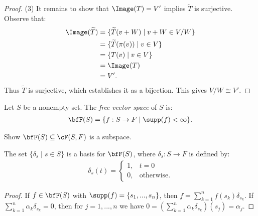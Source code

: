 \begin{proof}
            (3) It remains to show that $\Image(T) = V'$ implies $\widetilde{T}$ is surjective. Observe that:
                \begin{equation*}
                \begin{split}
                    \Image(\widetilde{T})
                    & = \{\widetilde{T}(v+W) \mid v+W \in V/W \} \\
                    & = \{\widetilde{T}(\pi(v)) \mid v \in V \} \\
                    & = \{T(v) \mid v \in V\} \\
                    & = \Image(T) \\
                    & = V'.
                \end{split}
                \end{equation*}
            Thus $\widetilde{T}$ is surjective, which establishes it as a bijection. This gives $V/W \cong V'$.
        \end{proof}

    \begin{definition}
        Let $S$ be a nonempty set. The \textit{free vector space} of $S$ is:
            \begin{equation*}
            \begin{split}
                \bfF(S) = \{f:S \rightarrow F \mid \supp(f) <\infty \}.
            \end{split}
            \end{equation*}
    \end{definition}

    \begin{exercise}
        Show $\bfF(S) \subseteq \cF(S,F)$ is a subspace.
    \end{exercise}

    \begin{proposition}
        The set $\{\delta_s \mid s \in S\}$ is a basis for $\bfF(S)$, where $\delta_s :S \rightarrow F$ is defined by:
            \begin{equation*}
            \begin{split}
                \delta_s(t) = \begin{cases}1, & t =0 \\ 0, & \text{otherwise.} \end{cases}
            \end{split}
            \end{equation*}
    \end{proposition}
        \begin{proof}
            If $f \in \bfF(S)$ with $\supp(f) = \{s_1,...,s_n\}$, then $f = \sum_{k =1}^n f(s_k)\delta_{s_k}$. If \newline$\sum_{k = 1}^n \alpha_k \delta_{s_k} = 0$, then for $j = 1,...,n$ we have $0 = \left( \sum_{k  =1}^n \alpha_k \delta_{s_k} \right)(s_j) = \alpha_j$.
        \end{proof}

